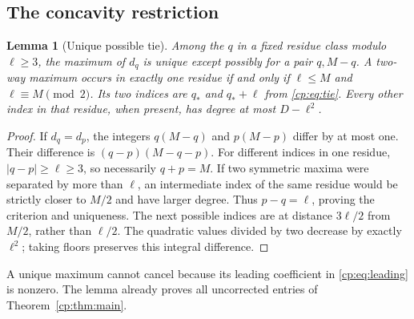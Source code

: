 \documentclass[11pt]{article}
\newtheorem{lemma}[theorem]{Lemma}
\theoremstyle{definition}
\theoremstyle{remark}
\theoremstyle{definition}
\theoremstyle{plain}
\numberwithin{equation}{section}
\begin{document}
\subsection{The concavity restriction}
\begin{lemma}[Unique possible tie]
\label{cp:lem:tie}
Among the $q$ in a fixed residue class modulo $\ell\ge3$, the maximum
of $d_q$ is unique except possibly for a pair $q,M-q$.
A two-way maximum occurs in exactly one residue if and only if
$\ell\le M$ and $\ell\equiv M\pmod2$. Its two indices are
$q_*$ and $q_*+\ell$ from \eqref{cp:eq:tie}.
Every other index in that residue, when present, has degree at most
$D-\ell^2$.
\end{lemma}
\begin{proof}
If $d_q=d_p$, the integers $q(M-q)$ and $p(M-p)$ differ by at most one.
Their difference is $(q-p)(M-q-p)$. For different indices in one residue,
$|q-p|\ge\ell\ge3$, so necessarily $q+p=M$.
If two symmetric maxima were separated by more than $\ell$, an intermediate
index of the same residue would be strictly closer to $M/2$ and have larger
degree. Thus $p-q=\ell$, proving the criterion and uniqueness.
The next possible indices are at distance $3\ell/2$ from $M/2$, rather
than $\ell/2$. The quadratic values divided by two decrease by exactly
$\ell^2$; taking floors preserves this integral difference.
\end{proof}

A unique maximum cannot cancel because its leading coefficient in
\eqref{cp:eq:leading} is nonzero. The lemma already proves all uncorrected
entries of Theorem~\ref{cp:thm:main}.
\end{document}
